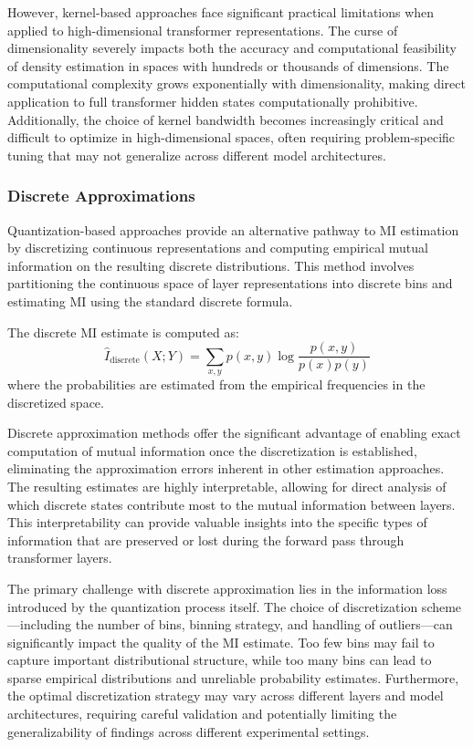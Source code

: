 However, kernel-based approaches face significant practical limitations when applied to high-dimensional transformer representations. The curse of dimensionality severely impacts both the accuracy and computational feasibility of density estimation in spaces with hundreds or thousands of dimensions. The computational complexity grows exponentially with dimensionality, making direct application to full transformer hidden states computationally prohibitive. Additionally, the choice of kernel bandwidth becomes increasingly critical and difficult to optimize in high-dimensional spaces, often requiring problem-specific tuning that may not generalize across different model architectures.

\subsubsection{Discrete Approximations}

Quantization-based approaches provide an alternative pathway to MI estimation by discretizing continuous representations and computing empirical mutual information on the resulting discrete distributions. This method involves partitioning the continuous space of layer representations into discrete bins and estimating MI using the standard discrete formula.

The discrete MI estimate is computed as:
\[
\hat{I}_{\text{discrete}}(X;Y) = \sum_{x,y} p(x,y) \log\frac{p(x,y)}{p(x)p(y)}
\]
where the probabilities are estimated from the empirical frequencies in the discretized space.

Discrete approximation methods offer the significant advantage of enabling exact computation of mutual information once the discretization is established, eliminating the approximation errors inherent in other estimation approaches. The resulting estimates are highly interpretable, allowing for direct analysis of which discrete states contribute most to the mutual information between layers. This interpretability can provide valuable insights into the specific types of information that are preserved or lost during the forward pass through transformer layers.

The primary challenge with discrete approximation lies in the information loss introduced by the quantization process itself. The choice of discretization scheme—including the number of bins, binning strategy, and handling of outliers—can significantly impact the quality of the MI estimate. Too few bins may fail to capture important distributional structure, while too many bins can lead to sparse empirical distributions and unreliable probability estimates. Furthermore, the optimal discretization strategy may vary across different layers and model architectures, requiring careful validation and potentially limiting the generalizability of findings across different experimental settings.

